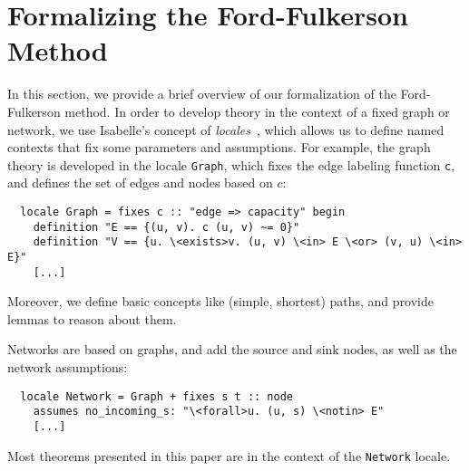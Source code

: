 \documentclass[smallcondensed]{svjour3}     %
\newcommand{\isai}{\lstinline[language=isabelle,basicstyle=\normalsize\ttfamily\slshape]}
\begin{document}
\section{Formalizing the Ford-Fulkerson Method}\label{sec:abs-formalization}
%
%    
%      
%    
%    


In this section, we provide a brief overview of our formalization of the Ford-Fulkerson method. 
In order to develop theory in the context of a fixed graph or network, we use Isabelle's concept of \emph{locales}~\cite{Ballarin:2006:MKM}, which allows
us to define named contexts that fix some parameters and assumptions.
For example, the graph theory is developed in the locale \isai{Graph}, which 
fixes the edge labeling function \isai{c}, and defines the set of edges and nodes based on $c$:
\begin{lstlisting}
  locale Graph = fixes c :: "edge => capacity" begin
    definition "E == {(u, v). c (u, v) ~= 0}"
    definition "V == {u. \<exists>v. (u, v) \<in> E \<or> (v, u) \<in> E}"
    [...]
\end{lstlisting}
Moreover, we define basic concepts like (simple, shortest) paths, and provide lemmas to reason about them.

Networks are based on graphs, and add the source and sink nodes, as well as the network assumptions:
\begin{lstlisting}
  locale Network = Graph + fixes s t :: node
    assumes no_incoming_s: "\<forall>u. (u, s) \<notin> E"
    [...]
\end{lstlisting}
Most theorems presented in this paper are in the context of the \isai{Network} locale.
\end{document}
